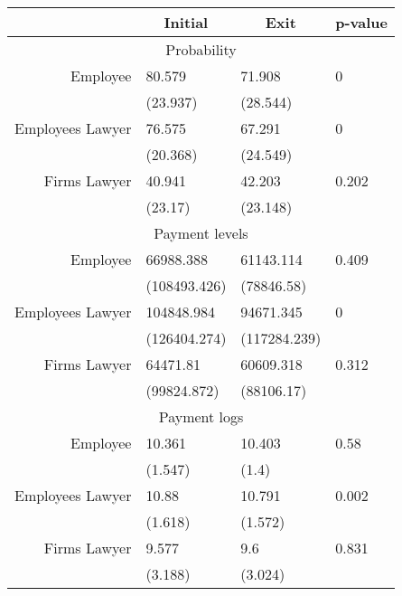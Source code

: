 \begin{tabular}{rrrr}
\toprule
      & \multicolumn{1}{c}{Initial} & \multicolumn{1}{c}{Exit} & \multicolumn{1}{c}{p-value} \\
\midrule
\multicolumn{4}{c}{Probability} \\
Employee  & \multicolumn{1}{l}{80.579} & \multicolumn{1}{l}{71.908} & \multicolumn{1}{l}{0} \\
      & \multicolumn{1}{l}{(23.937)} & \multicolumn{1}{l}{(28.544)} & \multicolumn{1}{l}{} \\
Employees Lawyer & \multicolumn{1}{l}{76.575} & \multicolumn{1}{l}{67.291} & \multicolumn{1}{l}{0} \\
      & \multicolumn{1}{l}{(20.368)} & \multicolumn{1}{l}{(24.549)} & \multicolumn{1}{l}{} \\
Firms Lawyer & \multicolumn{1}{l}{40.941} & \multicolumn{1}{l}{42.203} & \multicolumn{1}{l}{0.202} \\
      & \multicolumn{1}{l}{(23.17)} & \multicolumn{1}{l}{(23.148)} & \multicolumn{1}{l}{} \\
\multicolumn{4}{c}{Payment levels} \\
Employee  & \multicolumn{1}{l}{66988.388} & \multicolumn{1}{l}{61143.114} & \multicolumn{1}{l}{0.409} \\
      & \multicolumn{1}{l}{(108493.426)} & \multicolumn{1}{l}{(78846.58)} & \multicolumn{1}{l}{} \\
Employees Lawyer & \multicolumn{1}{l}{104848.984} & \multicolumn{1}{l}{94671.345} & \multicolumn{1}{l}{0} \\
      & \multicolumn{1}{l}{(126404.274)} & \multicolumn{1}{l}{(117284.239)} & \multicolumn{1}{l}{} \\
Firms Lawyer & \multicolumn{1}{l}{64471.81} & \multicolumn{1}{l}{60609.318} & \multicolumn{1}{l}{0.312} \\
      & \multicolumn{1}{l}{(99824.872)} & \multicolumn{1}{l}{(88106.17)} & \multicolumn{1}{l}{} \\
\multicolumn{4}{c}{Payment logs} \\
Employee  & \multicolumn{1}{l}{10.361} & \multicolumn{1}{l}{10.403} & \multicolumn{1}{l}{0.58} \\
      & \multicolumn{1}{l}{(1.547)} & \multicolumn{1}{l}{(1.4)} & \multicolumn{1}{l}{} \\
Employees Lawyer & \multicolumn{1}{l}{10.88} & \multicolumn{1}{l}{10.791} & \multicolumn{1}{l}{0.002} \\
      & \multicolumn{1}{l}{(1.618)} & \multicolumn{1}{l}{(1.572)} & \multicolumn{1}{l}{} \\
Firms Lawyer & \multicolumn{1}{l}{9.577} & \multicolumn{1}{l}{9.6} & \multicolumn{1}{l}{0.831} \\
      & \multicolumn{1}{l}{(3.188)} & \multicolumn{1}{l}{(3.024)} & \multicolumn{1}{l}{} \\
\bottomrule
\end{tabular}%
